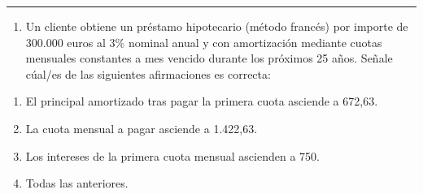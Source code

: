 \documentclass[
  letterpaper,
  DIV=11,
  numbers=noendperiod]{scrreprt}
\providecommand{\tightlist}{%
  \setlength{\itemsep}{0pt}\setlength{\parskip}{0pt}}\usepackage{longtable,booktabs,array}
\begin{document}
\begin{center}\rule{0.5\linewidth}{0.5pt}\end{center}

\begin{enumerate}
\def\labelenumi{\arabic{enumi}.}
\setcounter{enumi}{58}
\tightlist
\item
  Un cliente obtiene un préstamo hipotecario (método francés) por
  importe de 300.000 euros al 3\% nominal anual y con amortización
  mediante cuotas mensuales constantes a mes vencido durante los
  próximos 25 años. Señale cúal/es de las siguientes afirmaciones es
  correcta:
\end{enumerate}

\begin{enumerate}
\def\labelenumi{\alph{enumi})}
\item
  El principal amortizado tras pagar la primera cuota asciende a 672,63.
\item
  La cuota mensual a pagar asciende a 1.422,63.
\item
  Los intereses de la primera cuota mensual ascienden a 750.
\item
  Todas las anteriores.
\end{enumerate}
\end{document}
